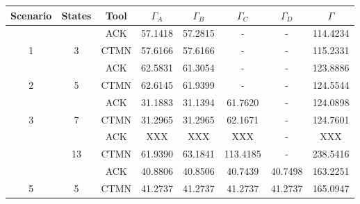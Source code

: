 \documentclass[a4paper]{article}
\begin{document}
	\begin{table}[]
		\centering
		\begin{tabular}{|c|c|c|c|c|c|c|c|}
		\hline
		\textbf{Scenario}                           & \textbf{States}                              & \textbf{Tool} & $\Gamma_A$ & $\Gamma_B$ & $\Gamma_C$ & $\Gamma_D$ & $\Gamma$   \\ \hline
		                                            &                                              & ACK       & 57.1418    & 57.2815    & -          & -          & 114.4234   \\ \cline{3-8} 
		\multirow{-2}{*}{1}                         & \multirow{-2}{*}{3}                          & CTMN          & 57.6166    & 57.6166    & -          & -          & 115.2331   \\ \hline
		                                            &                                              & ACK       & 62.5831    & 61.3054   & -          & -          & 123.8886   \\ \cline{3-8} 
		\multirow{-2}{*}{2}                         & \multirow{-2}{*}{5}                          & CTMN          & 62.6145    & 61.9399    & -          & -          & 124.5544   \\ \hline
		                                            &                                              & ACK       & 31.1883    & 31.1394    & 61.7620    & -          & 124.0898   \\ \cline{3-8} 
		\multirow{-2}{*}{3}                         & \multirow{-2}{*}{7}                          & CTMN          & 31.2965    & 31.2965    & 62.1671    & -          & 124.7601   \\ \hline
		\rowcolor[HTML]{FFCCC9} 
		\cellcolor[HTML]{FFCCC9}                    & \cellcolor[HTML]{FFCCC9}                     & ACK       & XXX    & XXX  & XXX   & -          & XXX \\ \cline{3-8} 
		\rowcolor[HTML]{FFCCC9} 
		\multirow{-2}{*}{\cellcolor[HTML]{FFCCC9}4} & \multirow{-2}{*}{\cellcolor[HTML]{FFCCC9}13} & CTMN          & 61.9390    & 63.1841    & 113.4185   & -          & 238.5416   \\ \hline
		                                            &                                              & ACK       & 40.8806   & 40.8506    & 40.7439    & 40.7498    & 163.2251   \\ \cline{3-8} 
		\multirow{-2}{*}{5}                         & \multirow{-2}{*}{5}                          & CTMN          & 41.2737    & 41.2737    & 41.2737    & 41.2737    & 165.0947   \\ \hline

\end{tabular}
\end{table}
\end{document}
